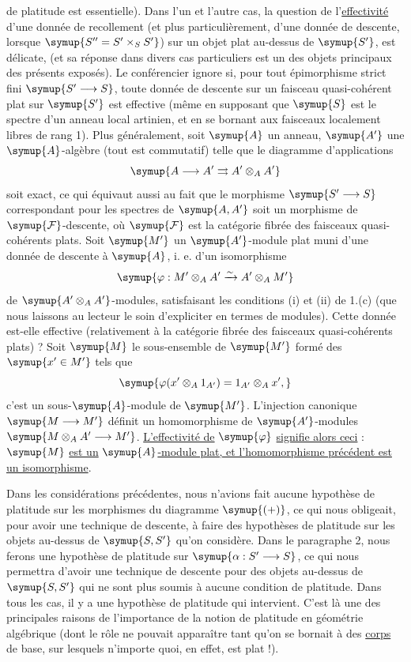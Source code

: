 de platitude est essentielle). Dans l'un et l'autre cas, la question de
l'\uline{effectivité} d'une donnée de recollement (et plus particulièrement, d'une
donnée de descente, lorsque $\symup{S''=S'\times_SS'}$) sur un objet plat au-dessus de
$\symup{S'}$, est délicate, (et sa réponse dans divers cas particuliers est un des objets
principaux des présents exposés). Le conférencier ignore si, pour tout
épimorphisme strict fini $\symup{S'\longrightarrow S}$, toute donnée de descente sur un
faisceau quasi-cohérent plat sur $\symup{S'}$ est effective (même en supposant que $\symup{S}$
est le spectre d'un anneau local artinien, et en se bornant aux faisceaux
localement libres de rang 1). Plus généralement, soit $\symup{A}$ un anneau, $\symup{A'}$ une
$\symup{A}$-algèbre (tout est commutatif) telle que le diagramme d'applications
\[
  \symup{A\longrightarrow A'\rightrightarrows A'\otimes_AA'}
\]
soit exact, ce qui équivaut aussi au fait que le morphisme
$\symup{S'\longrightarrow S}$ correspondant pour les spectres de $\symup{A,A'}$ soit un
morphisme de $\symup{\mathcal F}$-descente, où $\symup{\mathcal F}$ est la catégorie fibrée des
faisceaux quasi-cohérents plats. Soit $\symup{M'}$ un $\symup{A'}$-module plat muni d'une donnée
de descente à $\symup{A}$, i. e. d'un isomorphisme
\[
  \symup{\varphi:M'\otimes_AA'\xrightarrow{\sim}A'\otimes_AM'}
\]
de $\symup{A'\otimes_AA'}$-modules, satisfaisant les conditions (i) et (ii) de 1.(c) (que
nous laissons au lecteur le soin d'expliciter en termes de modules). Cette
donnée est-elle effective (relativement à la catégorie fibrée des faisceaux
quasi-cohérents plats) ? Soit $\symup{M}$ le sous-ensemble de $\symup{M'}$ formé des $\symup{x'\in M'}$
tels que
\[
  \symup{\varphi(x'\otimes_A1_{A'})=1_{A'}\otimes_Ax',}
\]
c'est un sous-$\symup{A}$-module de $\symup{M'}$. L'injection canonique
$\symup{M\longrightarrow M'}$ définit un homomorphisme de $\symup{A'}$-modules
$\symup{M\otimes_AA'\longrightarrow M'}$. \uline{L'effectivité de} $\symup{\varphi}$ \uline{signifie alors
ceci} : $\symup{M}$ \uline{est un} $\symup{A}$\uline{-module plat, et l'homomorphisme précédent est un
isomorphisme}.

 Dans les considérations précédentes, nous n'avions fait
aucune hypothèse de platitude sur les morphismes du diagramme $\symup{(+)}$, ce qui nous
obligeait, pour avoir une technique de descente, à faire des hypothèses de
platitude sur les objets au-dessus de $\symup{S,S'}$ qu'on considère. Dans le paragraphe
2, nous ferons une hypothèse de platitude sur $\symup{\alpha:S'\longrightarrow S}$, ce
qui nous permettra d'avoir une technique de descente pour des objets au-dessus
de $\symup{S,S'}$ qui ne sont plus soumis à aucune condition de platitude. Dans tous
les cas, il y a une hypothèse de platitude qui intervient. C'est là une des
principales raisons de l'importance de la notion de platitude en géométrie
algébrique (dont le rôle ne pouvait apparaître tant qu'on se bornait à des
\uline{corps} de base, sur lesquels n'importe quoi, en effet, est plat !).

